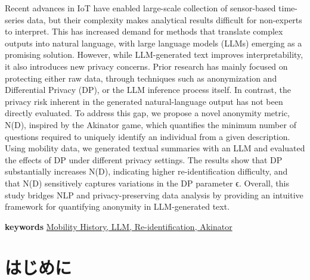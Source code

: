 \documentclass{my_bthesis}
\begin{document}

Recent advances in IoT have enabled large-scale collection of sensor-based time-series data, but their complexity makes analytical results difficult for non-experts to interpret. This has increased demand for methods that translate complex outputs into natural language, with large language models (LLMs) emerging as a promising solution. However, while LLM-generated text improves interpretability, it also introduces new privacy concerns.
Prior research has mainly focused on protecting either raw data, through techniques such as anonymization and Differential Privacy (DP), or the LLM inference process itself. In contrast, the privacy risk inherent in the generated natural-language output has not been directly evaluated. To address this gap, we propose a novel anonymity metric, N(D), inspired by the Akinator game, which quantifies the minimum number of questions required to uniquely identify an individual from a given description. Using mobility data, we generated textual summaries with an LLM and evaluated the effects of DP under different privacy settings. The results show that DP substantially increases N(D), indicating higher re-identification difficulty, and that N(D) sensitively captures variations in the DP parameter ϵ. Overall, this study bridges NLP and privacy-preserving data analysis by providing an intuitive framework for quantifying anonymity in LLM-generated text.

\vspace*{1mm}
\begin{center}
\noindent \textbf{keywords} \underline{Mobility History, LLM, Re-identification, Akinator}
\end{center}

\newpage %

\tableofcontents      %
\clearpage

\listoffigures        %
\clearpage

\listoftables         %
\clearpage

\startmaintext
{}


\chapter{はじめに}
\end{document}
